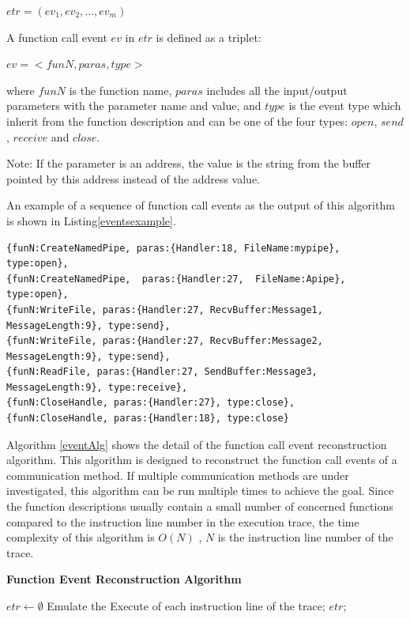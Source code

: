 $etr = (ev_1, ev_2, ..., ev_m)$

A function call event $ev$ in $etr$ is defined as a triplet:

$ev = <funN, paras, type>$

where $funN$ is the function name, $paras$ includes all the input/output parameters with the parameter name and value, and $type$ is the event type which inherit from the function description and can be one of the four types: $open$, $send$, $receive$ and $close$.

Note: If the parameter is an address, the value is the string from the buffer pointed by this address instead of the address value.

An example of a sequence of function call events as the output of this algorithm is shown in Listing\ref{eventsexample}.

\begin{lstlisting}[caption= Example of  $etr$, label=eventsexample]
{funN:CreateNamedPipe, paras:{Handler:18, FileName:mypipe}, type:open},
{funN:CreateNamedPipe,  paras:{Handler:27,  FileName:Apipe}, type:open},
{funN:WriteFile, paras:{Handler:27, RecvBuffer:Message1, MessageLength:9}, type:send},
{funN:WriteFile, paras:{Handler:27, RecvBuffer:Message2, MessageLength:9}, type:send},
{funN:ReadFile, paras:{Handler:27, SendBuffer:Message3, MessageLength:9}, type:receive},
{funN:CloseHandle, paras:{Handler:27}, type:close},
{funN:CloseHandle, paras:{Handler:18}, type:close}
\end{lstlisting}


Algorithm \ref{eventAlg} shows the detail of the function call event reconstruction algorithm. This algorithm is designed to reconstruct the function call events of a communication method. If multiple communication methods are under investigated, this algorithm can be run multiple times to achieve the goal. Since the function descriptions usually contain a  small number of concerned functions compared to the instruction line number in the execution trace, the time complexity of this algorithm is $O(N)$ , $N$ is the instruction line number of the trace.

\begin{algorithm}[H]
\DontPrintSemicolon
\caption{{\bf Function Event Reconstruction Algorithm} \label{eventAlg}}
$etr \leftarrow \emptyset$\; 
Emulate the Execute of each instruction line of the trace;\;
\KwRet $etr$;\;
\end{algorithm} 

